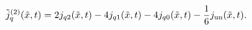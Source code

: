\begin{equation}
\label{Eq:jq-tilde}
\tilde j^{(2)}_q(\tilde x, t)= 2j_{q2}(\tilde x, t)
-4j_{q1}(\tilde x, t)
-4j_{q0}(\tilde x, t)
-\frac{1}{6} j_{\rm un}(\tilde x, t).
\end{equation}

